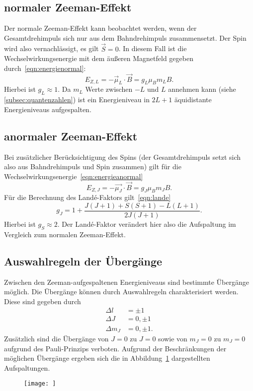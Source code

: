 \subsection*{normaler Zeeman-Effekt}
Der normale Zeeman-Effekt kann beobachtet werden, wenn der Gesamtdrehimpuls
sich nur aus dem Bahndrehimpuls zusammensetzt. Der Spin wird also
vernachlässigt, es gilt $\vec{S} = 0$.
In diesem Fall ist die Wechselwirkungsenergie mit dem äußeren Magnetfeld
gegeben durch~\ref{eqn:energienormal}:
\begin{equation}
  E_{Z,L} = - \vec{\mu}_{L} \cdot \vec{B} = g_{L} \mu_{B} m_{L} B.
  \label{eqn:energienormal}
\end{equation}
Hierbei ist $g_{L} \approx 1$.
Da $m_{L}$ Werte zwischen $-L$ und $L$ annehmen kann (siehe \ref{subsec:quantenzahlen})
ist ein Energieniveau in $2L+1$ äquidistante Energieniveaus aufgespalten.
\subsection*{anormaler Zeeman-Effekt}
Bei zusätzlicher Berücksichtigung des Spins (der Gesamtdrehimpuls setzt sich also
aus Bahndrehimpuls und Spin zusammen) gilt für die
Wechselwirkungsenergie~\ref{eqn:energieanormal}
\begin{equation}
 E_{Z, J} = -\vec{\mu_{J}} \cdot \vec{B} = g_{J} \mu_{B}m_{J} B.
 \label{eqn:energieanormal}
\end{equation}
Für die Berechnung des Land\'e-Faktors gilt~\ref{eqn:lande}
\begin{equation}
  g_{J} = 1 + \frac{J(J+1) + S(S+1) - L(L+1)}{2J(J+1)}.
  \label{eqn:lande}
\end{equation}
Hierbei ist $g_{S} \approx 2$. Der Land\'e-Faktor verändert hier also die Aufspaltung
im Vergleich zum normalen Zeeman-Effekt.

\subsection{Auswahlregeln der Übergänge}
\label{subsec:auswahlregeln}
Zwischen den Zeeman-aufgespaltenen Energieniveaus sind bestimmte Übergänge
möglich. Die Übergänge können durch Auswahlregeln charakterisiert werden.
Diese sind gegeben durch
\begin{align}
  \Delta l &= \pm 1 \\
  \Delta J & =  0, \pm 1 \\
  \Delta m_{J} & = 0, \pm 1.
  \label{eqn:auswahlregeln}
\end{align}
Zusätzlich sind die Übergänge von $J = 0$ zu $J = 0$ sowie von $m_{J} = 0$ zu
$m_{J} = 0$ aufgrund des Pauli-Prinzips verboten. Aufgrund der Beschränkungen
der möglichen Übergänge ergeben sich die in Abbildung~\ref{fig:uebergang1}
dargestellten Aufspaltungen.
\begin{figure}
  \texttt{[image: ]}
  \label{fig:uebergang1}
\end{figure}
